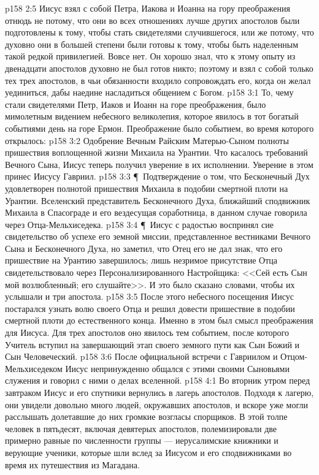 \vs p158 2:5 Иисус взял с собой Петра, Иакова и Иоанна на гору преображения отнюдь не потому, что они во всех отношениях лучше других апостолов были подготовлены к тому, чтобы стать свидетелями случившегося, или же потому, что духовно они в большей степени были готовы к тому, чтобы быть наделенным такой редкой привилегией. Вовсе нет. Он хорошо знал, что к этому опыту из двенадцати апостолов духовно не был готов никто; поэтому и взял с собой только тех трех апостолов, в чьи обязанности входило сопровождать его, когда он желал уединиться, дабы наедине насладиться общением с Богом.
\vs p158 3:1 То, чему стали свидетелями Петр, Иаков и Иоанн на горе преображения, было мимолетным видением небесного великолепия, которое явилось в тот богатый событиями день на горе Ермон. Преображение было событием, во время которого открылось:
\vs p158 3:2 \bibnobreakspace Одобрение Вечным Райским Матерью\hyp{}Сыном полноты пришествия воплощенной жизни Михаила на Урантии. Что касалось требований Вечного Сына, Иисус теперь получил уверение в их исполнении. Уверение в этом принес Иисусу Гавриил.
\vs p158 3:3 \P\ \bibnobreakspace Подтверждение о том, что Бесконечный Дух удовлетворен полнотой пришествия Михаила в подобии смертной плоти на Урантии. Вселенский представитель Бесконечного Духа, ближайший сподвижник Михаила в Спасограде и его вездесущая соработница, в данном случае говорила через Отца\hyp{}Мельхиседека.
\vs p158 3:4 \P\ Иисус с радостью воспринял сие свидетельство об успехе его земной миссии, представленное вестниками Вечного Сына и Бесконечного Духа, но заметил, что Отец его не дал знак, что его пришествие на Урантию завершилось; лишь незримое присутствие Отца свидетельствовало через Персонализированного Настройщика: <<Сей есть Сын мой возлюбленный; его слушайте>>. И это было сказано словами, чтобы их услышали и три апостола.
\vs p158 3:5 После этого небесного посещения Иисус постарался узнать волю своего Отца и решил довести пришествие в подобии смертной плоти до естественного конца. Именно в этом был смысл преображения для Иисуса. Для трех апостолов оно явилось тем событием, после которого Учитель вступил на завершающий этап своего земного пути как Сын Божий и Сын Человеческий.
\vs p158 3:6 После официальной встречи с Гавриилом и Отцом\hyp{}Мельхиседеком Иисус непринужденно общался с этими своими Сыновьями служения и говорил с ними о делах вселенной.
\vs p158 4:1 Во вторник утром перед завтраком Иисус и его спутники вернулись в лагерь апостолов. Подходя к лагерю, они увидели довольно много людей, окружавших апостолов, и вскоре уже могли расслышать долетавшие до них громкие возгласы спорщиков. В этой толпе человек в пятьдесят, включая девятерых апостолов, полемизировали две примерно равные по численности группы --- иерусалимские книжники и верующие ученики, которые шли вслед за Иисусом и его сподвижниками во время их путешествия из Магадана.

